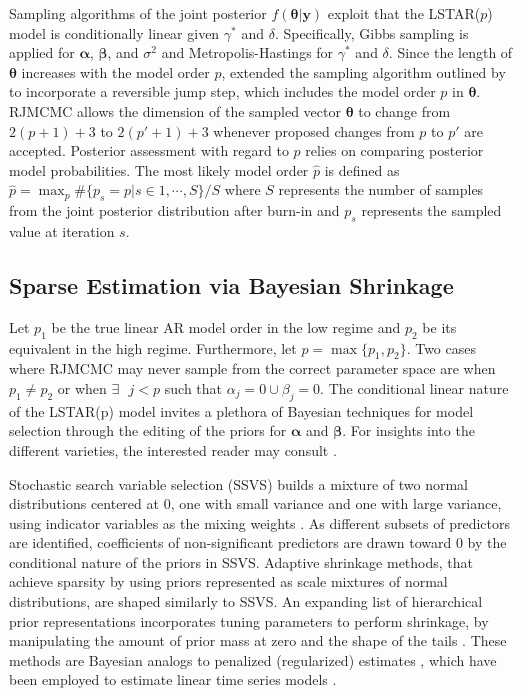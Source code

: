 Sampling algorithms of the joint posterior $f(\bm{\theta}|\bm{y})$ exploit that the LSTAR($p$) model is conditionally linear given $\gamma^*$ and $\delta$. Specifically, Gibbs sampling is applied for $\bm{\alpha}$, $\bm{\beta}$, and $\sigma^2$  \citep{Gelfand1990} and Metropolis-Hastings \citep{Metropolis1953,Hastings1970} for $\gamma^*$ and $\delta$. Since the length of $\bm{\theta}$ increases with the model order $p$, \cite{Lopes2006} extended the sampling algorithm outlined by \cite{Lubrano2000} to incorporate a reversible jump step, which includes the model order $p$ in $\bm{\theta}$. RJMCMC allows the dimension of the sampled vector $\bm{\theta}$ to change from $2(p+1)+3$ to $2(p'+1)+3$ whenever proposed changes from $p$ to $p'$ are accepted. Posterior assessment with regard to $p$ relies on comparing  posterior model probabilities. The most likely model order $\hat{p}$ is defined as $\hat{p}=\max_{p}\#\{p_s=p| s \in {1,\cdots, S}\}/S$  where $S$ represents the number of samples from the joint posterior distribution after burn-in and $p_s$ represents the sampled value at iteration $s$. 

\subsection{Sparse Estimation via Bayesian Shrinkage}
Let $p_1$ be the true linear AR model order in the low regime and $p_2$ be its equivalent in the high regime. Furthermore, let $p=\max\{p_1, p_2\}$. Two cases where RJMCMC may never sample from the correct parameter space are when $p_1\neq p_2$ or when $\exists \textrm{ } j <p$ such that $\alpha_j=0 \cup \beta_j=0$. The conditional linear nature of the LSTAR(p) model invites a plethora of Bayesian techniques for model selection through the editing of the priors for $\bm{\alpha}$ and $\bm{\beta}$. For insights into the different varieties, the interested reader may consult \cite{OHara2009}. 

Stochastic search variable selection (SSVS) builds a mixture of two normal distributions centered at 0, one with small variance and one with large variance, using indicator variables as the mixing weights \citep{George1993}. As different subsets of predictors are identified, coefficients of non-significant predictors are drawn toward 0 by the conditional nature of the priors in SSVS. Adaptive shrinkage methods, that achieve sparsity by using priors represented as scale mixtures of normal distributions, are shaped similarly to SSVS. An expanding list of hierarchical prior representations incorporates tuning parameters to perform shrinkage, by manipulating the amount of prior mass at zero and the shape of the tails \citep{Polson2010}. These methods are Bayesian analogs to penalized (regularized) estimates \citep{Tibshirani1996}, which have been employed to estimate linear time series models \citep{Konzen2016,Nardi2011}. 

